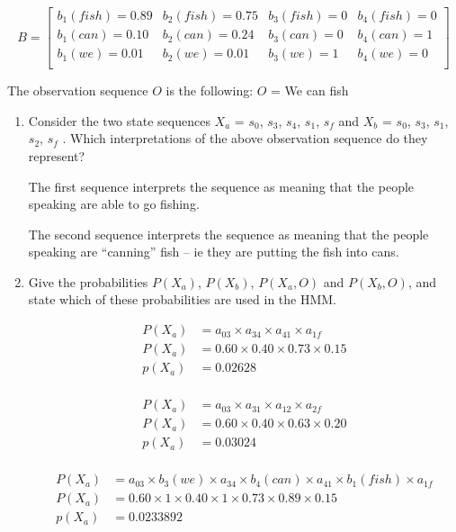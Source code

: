 \documentclass[10pt,\jkfside,a4paper]{article}
\begin{document}
\[B = 
\begin{bmatrix}
b_1(fish) = 0.89 & b_2(fish) = 0.75 & b_3(fish) = 0 & b_4(fish) = 0 \\
b_1(can) = 0.10 & b_2(can) = 0.24 & b_3(can) = 0 & b_4(can) = 1 \\
b_1(we) = 0.01 & b_2(we) = 0.01 & b_3(we) = 1 & b_4(we) = 0 \\
\end{bmatrix}
\]

The observation sequence $O$ is the following: $O$ = We can fish

\begin{enumerate}

\item Consider the two state sequences $X_a$ = $s_0$, $s_3$, $s_4$, $s_1$, $s_f$ and $X_b$ =
$s_0$, $s_3$, $s_1$, $s_2$, $s_f$ . Which interpretations of the above 
observation sequence do they represent?

The first sequence interprets the sequence as meaning that the people 
speaking are able to go fishing.

The second sequence interprets the sequence as meaning that the people 
speaking are ``canning'' fish -- ie they are putting the fish into cans.

\item Give the probabilities $P(X_a)$, $P(X_b)$, $P(X_a, O)$ and $P(X_b, O)$, and state
which of these probabilities are used in the HMM.

\begin{equation}
\begin{split}
P(X_a) &= a_{03} \times a_{34} \times a_{41} \times a_{1f} \\
P(X_a) &= 0.60 \times 0.40 \times 0.73 \times 0.15 \\
p(X_a) &= 0.02628 \\
\end{split}
\end{equation}

\begin{equation}
\begin{split}
P(X_a) &= a_{03} \times a_{31} \times a_{12} \times a_{2f} \\
P(X_a) &= 0.60 \times 0.40 \times 0.63 \times 0.20 \\
p(X_a) &= 0.03024 \\
\end{split}
\end{equation}

\begin{equation}
\begin{split}
P(X_a) &= a_{03} \times b_3(we) \times a_{34} \times b_4(can) \times a_{41} \times b_1(fish) \times a_{1f} \\
P(X_a) &= 0.60 \times 1 \times 0.40 \times 1 \times 0.73 \times 0.89 \times 0.15 \\
p(X_a) &= 0.0233892 \\
\end{split}
\end{equation}


\end{enumerate}
\end{document}
